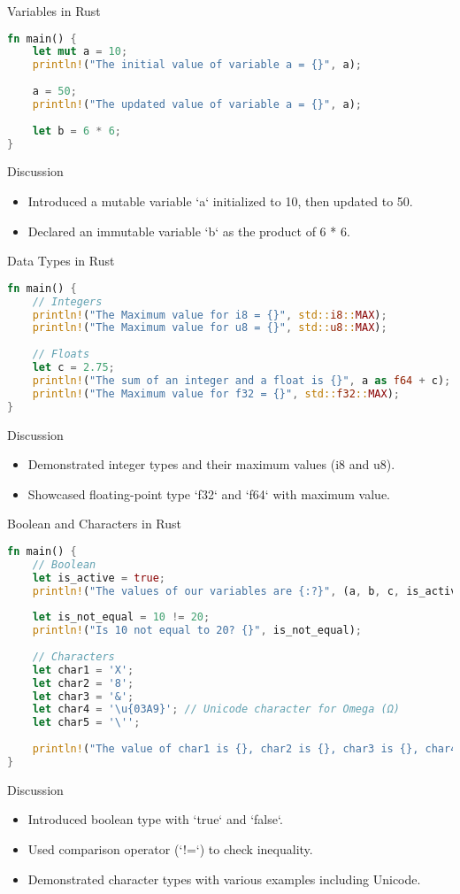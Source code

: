 \documentclass[aspectratio=169, table]{beamer}
\begin{document}


\begin{frame}[fragile]{Variables in Rust}
\begin{lstlisting}[language=Rust]
fn main() {
	let mut a = 10;
	println!("The initial value of variable a = {}", a);
	
	a = 50;
	println!("The updated value of variable a = {}", a);
	
	let b = 6 * 6;
}
\end{lstlisting}
\end{frame}

\begin{frame}{Discussion}
\begin{itemize}
\item Introduced a mutable variable `a` initialized to 10, then updated to 50.
\item Declared an immutable variable `b` as the product of 6 * 6.
\end{itemize}
\end{frame}

\begin{frame}[fragile]{Data Types in Rust}
\begin{lstlisting}[language=Rust]
fn main() {
	// Integers
	println!("The Maximum value for i8 = {}", std::i8::MAX);
	println!("The Maximum value for u8 = {}", std::u8::MAX);
	
	// Floats
	let c = 2.75;
	println!("The sum of an integer and a float is {}", a as f64 + c);
	println!("The Maximum value for f32 = {}", std::f32::MAX);
}
\end{lstlisting}
\end{frame}

\begin{frame}{Discussion}
\begin{itemize}
\item Demonstrated integer types and their maximum values (i8 and u8).
\item Showcased floating-point type `f32` and `f64` with maximum value.
\end{itemize}
\end{frame}

\begin{frame}[fragile]{Boolean and Characters in Rust}
\begin{lstlisting}[language=Rust]
fn main() {
	// Boolean
	let is_active = true;
	println!("The values of our variables are {:?}", (a, b, c, is_active));
	
	let is_not_equal = 10 != 20;
	println!("Is 10 not equal to 20? {}", is_not_equal);
	
	// Characters
	let char1 = 'X';
	let char2 = '8';
	let char3 = '&';
	let char4 = '\u{03A9}'; // Unicode character for Omega (Ω)
	let char5 = '\'';
	
	println!("The value of char1 is {}, char2 is {}, char3 is {}, char4 is {} and char5 is {}", char1, char2, char3, char4, char5);
}
\end{lstlisting}
\end{frame}

\begin{frame}{Discussion}
\begin{itemize}
\item Introduced boolean type with `true` and `false`.
\item Used comparison operator (`!=`) to check inequality.
\item Demonstrated character types with various examples including Unicode.
\end{itemize}
\end{frame}
\end{document}
